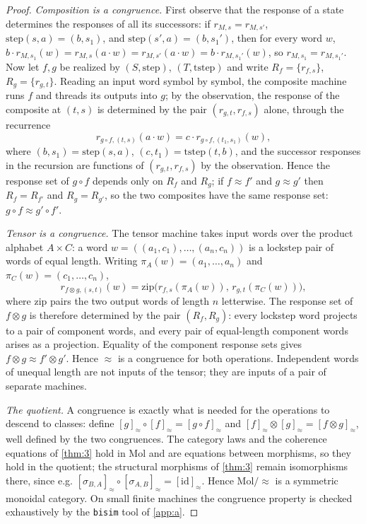 \begin{proof}
\emph{Composition is a congruence.} First observe that the response of a
state determines the responses of all its successors: if
$r_{M,s} = r_{M,s'}$, $\mathrm{step} (s, a) = (b, s_1)$, and
$\mathrm{step} (s', a) = (b, s_1')$, then for every word $w$,
$b \cdot r_{M,s_1} (w) = r_{M,s} (a \cdot w) = r_{M,s'} (a \cdot w) =
b \cdot r_{M,s_1'} (w)$, so $r_{M,s_1} = r_{M,s_1'}$. Now let $f, g$ be
realized by $(S, \mathrm{step})$, $(T, \mathrm{tstep})$ and write
$R_f = \{ r_{f,s} \}$, $R_g = \{ r_{g,t} \}$. Reading an input word symbol by
symbol, the composite machine runs $f$ and threads its outputs into $g$; by
the observation, the response of the composite at $(t, s)$ is determined by
the pair $(r_{g,t}, r_{f,s})$ alone, through the recurrence
\[ r_{g \circ f, (t,s)} (a \cdot w)
   = c \cdot r_{g \circ f, (t_1, s_1)} (w) , \]
where $(b, s_1) = \mathrm{step} (s, a)$, $(c, t_1) = \mathrm{tstep} (t, b)$,
and the successor responses in the recursion are functions of
$(r_{g,t}, r_{f,s})$ by the observation. Hence the response set of $g \circ f$
depends only on $R_f$ and $R_g$; if $f \approx f'$ and $g \approx g'$ then
$R_f = R_{f'}$ and $R_g = R_{g'}$, so the two composites have the same
response set: $g \circ f \approx g' \circ f'$.

\emph{Tensor is a congruence.} The tensor machine takes input words over
the product alphabet $A \times C$: a word
$w = ((a_1, c_1), \ldots, (a_n, c_n))$ is a lockstep pair of words of
equal length. Writing $\pi_A (w) = (a_1, \ldots, a_n)$ and
$\pi_C (w) = (c_1, \ldots, c_n)$,
\[ r_{f \otimes g, (s,t)} (w)
   = \mathrm{zip}\bigl (r_{f,s} (\pi_A (w)),\, r_{g,t} (\pi_C (w))\bigr) , \]
where $\mathrm{zip}$ pairs the two output words of length $n$ letterwise.
The response set of $f \otimes g$ is therefore determined by the pair
$(R_f, R_g)$: every lockstep word projects to a pair of component words,
and every pair of equal-length component words arises as a projection.
Equality of the component response sets gives
$f \otimes g \approx f' \otimes g'$. Hence $\approx$ is a congruence for
both operations. Independent words of unequal length are not inputs of
the tensor; they are inputs of a pair of separate machines.

\emph{The quotient.} A congruence is exactly what is needed for the
operations to descend to classes: define
$[g]_{\approx} \circ [f]_{\approx} = [g \circ f]_{\approx}$ and
$[f]_{\approx} \otimes [g]_{\approx} = [f \otimes g]_{\approx}$, well defined
by the two congruences. The category laws and the coherence equations of
\autoref{thm:3} hold in Mol and are equations between morphisms, so they hold
in the quotient; the structural morphisms of \autoref{thm:3} remain
isomorphisms there, since e.g.
$[\sigma_{B,A}]_{\approx} \circ [\sigma_{A,B}]_{\approx} =
[\mathrm{id}]_{\approx}$. Hence $\mathrm{Mol}/{\approx}$ is a symmetric
monoidal category. On small finite machines the congruence property is
checked exhaustively by the \texttt{bisim} tool of \autoref{app:a}.
\end{proof}

